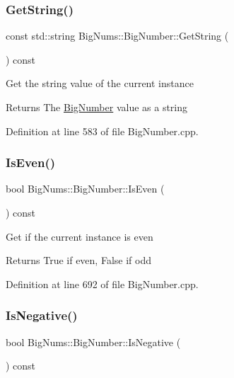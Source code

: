 \subsubsection{\texorpdfstring{GetString()}{GetString()}}
{\footnotesize\ttfamily const std\+::string Big\+Nums\+::\+Big\+Number\+::\+Get\+String (\begin{DoxyParamCaption}{ }\end{DoxyParamCaption}) const}

Get the string value of the current instance \begin{DoxyReturn}{Returns}
The \mbox{\hyperlink{class_big_nums_1_1_big_number}{Big\+Number}} value as a string 
\end{DoxyReturn}


Definition at line 583 of file Big\+Number.\+cpp.

\mbox{\label{class_big_nums_1_1_big_number_abf9a23b42aa137baa8a040a6cf524cca}} 
\subsubsection{\texorpdfstring{IsEven()}{IsEven()}}
{\footnotesize\ttfamily bool Big\+Nums\+::\+Big\+Number\+::\+Is\+Even (\begin{DoxyParamCaption}{ }\end{DoxyParamCaption}) const}

Get if the current instance is even \begin{DoxyReturn}{Returns}
True if even, False if odd 
\end{DoxyReturn}


Definition at line 692 of file Big\+Number.\+cpp.

\mbox{\label{class_big_nums_1_1_big_number_af5203c02639f6dc409016bfb4710dafc}} 
\subsubsection{\texorpdfstring{IsNegative()}{IsNegative()}}
{\footnotesize\ttfamily bool Big\+Nums\+::\+Big\+Number\+::\+Is\+Negative (\begin{DoxyParamCaption}{ }\end{DoxyParamCaption}) const}

